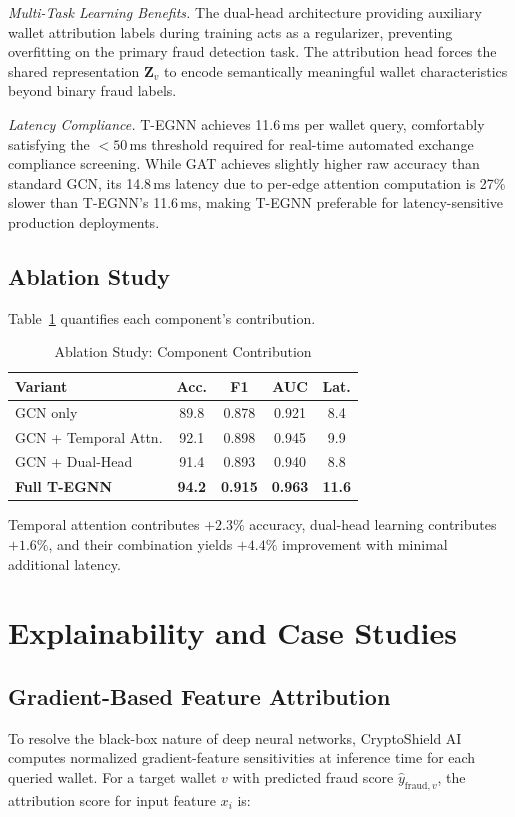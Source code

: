 \documentclass[conference]{IEEEtran}
\begin{document}
\textit{Multi-Task Learning Benefits.} The dual-head architecture providing auxiliary wallet attribution labels during training acts as a regularizer, preventing overfitting on the primary fraud detection task. The attribution head forces the shared representation $\mathbf{Z}_v$ to encode semantically meaningful wallet characteristics beyond binary fraud labels.

\textit{Latency Compliance.} T-EGNN achieves 11.6\,ms per wallet query, comfortably satisfying the $<50$\,ms threshold required for real-time automated exchange compliance screening. While GAT achieves slightly higher raw accuracy than standard GCN, its 14.8\,ms latency due to per-edge attention computation is 27\% slower than T-EGNN's 11.6\,ms, making T-EGNN preferable for latency-sensitive production deployments.

\subsection{Ablation Study}

Table~\ref{tab:ablation} quantifies each component's contribution.

\begin{table}[htbp]
\caption{Ablation Study: Component Contribution}
\label{tab:ablation}
\centering
\small
\begin{tabular}{@{}lcccc@{}}
\toprule
\textbf{Variant} & \textbf{Acc.} & \textbf{F1} & \textbf{AUC} & \textbf{Lat.} \\
\midrule
GCN only & 89.8 & 0.878 & 0.921 & 8.4 \\
GCN + Temporal Attn. & 92.1 & 0.898 & 0.945 & 9.9 \\
GCN + Dual-Head & 91.4 & 0.893 & 0.940 & 8.8 \\
\textbf{Full T-EGNN} & \textbf{94.2} & \textbf{0.915} & \textbf{0.963} & \textbf{11.6} \\
\bottomrule
\end{tabular}
\end{table}

Temporal attention contributes $+2.3\%$ accuracy, dual-head learning contributes $+1.6\%$, and their combination yields $+4.4\%$ improvement with minimal additional latency.

\section{Explainability and Case Studies}
\label{sec:xai}

\subsection{Gradient-Based Feature Attribution}
To resolve the black-box nature of deep neural networks, CryptoShield AI computes normalized gradient-feature sensitivities at inference time for each queried wallet. For a target wallet $v$ with predicted fraud score $\hat{y}_{\text{fraud},v}$, the attribution score for input feature $x_i$ is:
\end{document}

